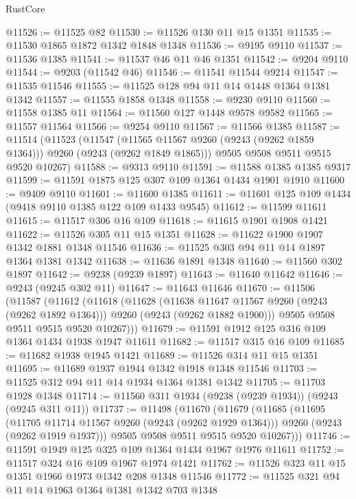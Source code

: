 \begin{lexlean}{RustCore}
\begin{coremodule}
@11526 := @11525 @82
@11530 := @11526 @130 @11 @15 @1351
@11535 := @11530 @1865 @1872 @1342 @1848 @1348
@11536 := @9195 @9110
@11537 := @11536 @1385
@11541 := @11537 @46 @11 @46 @1351
@11542 := @9204 @9110
@11544 := @9203 (@11542 @46)
@11546 := @11541 @11544 @9214
@11547 := @11535 @11546
@11555 := @11525 @128 @94 @11 @14 @1448 @1364 @1381 @1342
@11557 := @11555 @1858 @1348
@11558 := @9230 @9110
@11560 := @11558 @1385 @11
@11564 := @11560 @127 @1448 @9578 @9582
@11565 := @11557 @11564
@11566 := @9254 @9110
@11567 := @11566 @1385
@11587 := @11514
    (@11523
      (@11547 (@11565 @11567 @9260 (@9243 (@9262 @1859 @1364))) @9260 (@9243 (@9262 @1849 @1865)))
      @9505
      @9508
      @9511
      @9515
      @9520
      @10267)
@11588 := @9313 @9110
@11591 := @11588 @1385 @1385 @9317
@11599 := @11591 @1875 @125 @307 @109 @1364 @1434 @1901 @1910
@11600 := @9409 @9110
@11601 := @11600 @1385
@11611 := @11601 @125 @109 @1434 (@9418 @9110 @1385 @122 @109 @1433 @9545)
@11612 := @11599 @11611
@11615 := @11517 @306 @16 @109
@11618 := @11615 @1901 @1908 @1421
@11622 := @11526 @305 @11 @15 @1351
@11628 := @11622 @1900 @1907 @1342 @1881 @1348 @11546
@11636 := @11525 @303 @94 @11 @14 @1897 @1364 @1381 @1342
@11638 := @11636 @1891 @1348
@11640 := @11560 @302 @1897
@11642 := @9238 (@9239 @1897)
@11643 := @11640 @11642
@11646 := @9243 (@9245 @302 @11)
@11647 := @11643 @11646
@11670 := @11506
    (@11587
      (@11612
        (@11618
          (@11628
            (@11638 @11647 @11567 @9260 (@9243 (@9262 @1892 @1364)))
            @9260
            (@9243 (@9262 @1882 @1900)))
          @9505
          @9508
          @9511
          @9515
          @9520
          @10267)))
@11679 := @11591 @1912 @125 @316 @109 @1364 @1434 @1938 @1947 @11611
@11682 := @11517 @315 @16 @109
@11685 := @11682 @1938 @1945 @1421
@11689 := @11526 @314 @11 @15 @1351
@11695 := @11689 @1937 @1944 @1342 @1918 @1348 @11546
@11703 := @11525 @312 @94 @11 @14 @1934 @1364 @1381 @1342
@11705 := @11703 @1928 @1348
@11714 := @11560 @311 @1934 (@9238 (@9239 @1934)) (@9243 (@9245 @311 @11))
@11737 := @11498
    (@11670
      (@11679
        (@11685
          (@11695
            (@11705 @11714 @11567 @9260 (@9243 (@9262 @1929 @1364)))
            @9260
            (@9243 (@9262 @1919 @1937)))
          @9505
          @9508
          @9511
          @9515
          @9520
          @10267)))
@11746 := @11591 @1949 @125 @325 @109 @1364 @1434 @1967 @1976 @11611
@11752 := @11517 @324 @16 @109 @1967 @1974 @1421
@11762 := @11526 @323 @11 @15 @1351 @1966 @1973 @1342 @208 @1348 @11546
@11772 := @11525 @321 @94 @11 @14 @1963 @1364 @1381 @1342 @703 @1348

\end{coremodule}
\end{lexlean}
